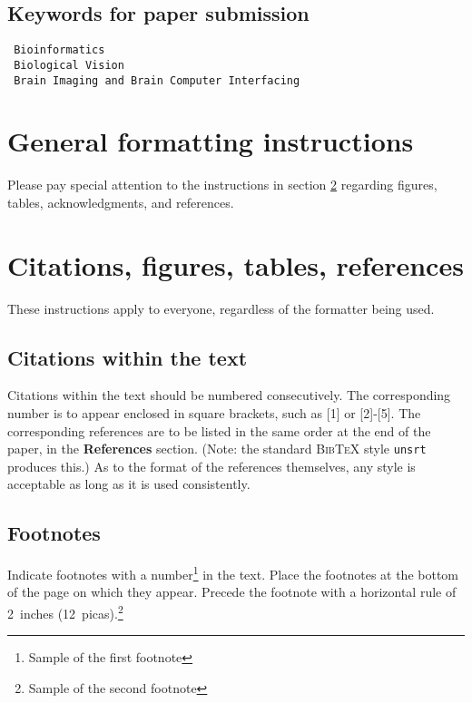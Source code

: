 \documentclass{article}
\theoremstyle{plain}
\begin{document}
\subsection{Keywords for paper submission}

 \begin{verbatim}
 Bioinformatics
 Biological Vision
 Brain Imaging and Brain Computer Interfacing
 \end{verbatim}


\section{General formatting instructions}
\label{gen_inst}

Please pay special attention to the instructions in section \ref{others}
regarding figures, tables, acknowledgments, and references.


\section{Citations, figures, tables, references}
\label{others}

These instructions apply to everyone, regardless of the formatter being used.

\subsection{Citations within the text}

Citations within the text should be numbered consecutively. The corresponding
number is to appear enclosed in square brackets, such as [1] or [2]-[5]. The
corresponding references are to be listed in the same order at the end of the
paper, in the \textbf{References} section. (Note: the standard
\textsc{Bib\TeX} style \texttt{unsrt} produces this.) As to the format of the
references themselves, any style is acceptable as long as it is used
consistently.

\subsection{Footnotes}

Indicate footnotes with a number\footnote{Sample of the first footnote} in the
text. Place the footnotes at the bottom of the page on which they appear.
Precede the footnote with a horizontal rule of 2~inches
(12~picas).\footnote{Sample of the second footnote}
\end{document}

